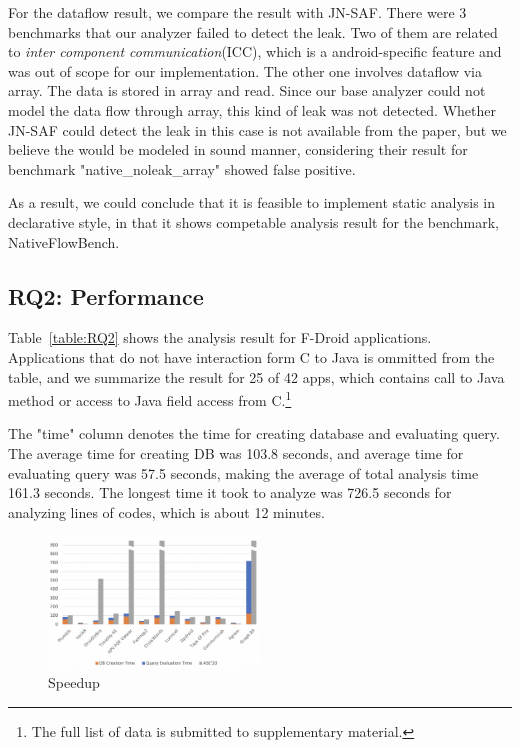 For the dataflow result, we compare the result with JN-SAF. There were 3
benchmarks that our analyzer failed to detect the leak. Two of them are related
to \textit{inter component communication}(ICC), which is a android-specific
feature and was out of scope for our implementation. The other one involves
dataflow via array. The data is stored in array and read. Since our base
analyzer could not model the data flow through array, this kind of leak was not
detected. Whether JN-SAF could detect the leak in this case is not available
from the paper, but we believe the would be modeled in sound manner,
considering their result for benchmark "native\_noleak\_array" showed false
positive. 

As a result, we could conclude that it is feasible to implement static analysis
in declarative style, in that it shows competable analysis result for the
benchmark, NativeFlowBench.


\subsection{RQ2: Performance}

Table~\ref{table:RQ2} shows the analysis result for F-Droid applications.
Applications that do not have interaction form C to Java is ommitted from the
table, and we summarize the result for 25 of 42 apps, which contains call to
Java method or access to Java field access from C.\footnote{The full list of data
is submitted to supplementary material.}

The "time" column denotes the time for creating database and evaluating query.
The average time for creating DB was 103.8 seconds, and average time for
evaluating query was 57.5 seconds, making the average of total analysis time
161.3 seconds. The longest time it took to analyze was 726.5 seconds for
analyzing  lines of codes, which is about 12 minutes.

\begin{figure}[t]
  \centering
  \vspace{2mm}
  \includegraphics[width=0.5\textwidth]{img/graph}
  \vspace*{-1.5em}
  \caption{Speedup}
  \label{fig:graph}
\vspace*{-.5em}
\end{figure}

